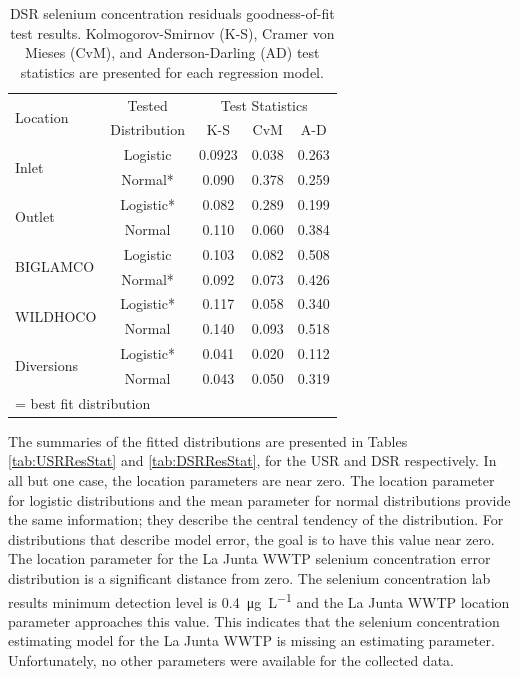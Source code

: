 \begin{linenumbers}
\begin{table}[htbp]
  \centering
  \caption[DSR selenium concentration residuals goodness-of-fit test results.]{DSR selenium concentration residuals goodness-of-fit test results.  Kolmogorov-Smirnov (K-S), Cramer von Mieses (CvM), and Anderson-Darling (AD) test statistics are presented for each regression model.}
    \begin{tabular}{lcccc}
    \toprule
    \multirow{2}{*}{Location}&Tested & \multicolumn{3}{c}{Test Statistics} \\ \cline{3-5}
    &Distribution  & K-S   & CvM   & A-D \\
    \midrule
    \midrule
    \multirow{2}{*}{Inlet}			&Logistic	&0.0923	&0.038	&0.263	\\
    								&Normal*	&0.090	&0.378	&0.259	\\
    \midrule
    \multirow{2}{*}{Outlet}			&Logistic*	&0.082	&0.289	&0.199	\\
    								&Normal		&0.110	&0.060	&0.384	\\
    \midrule
    \multirow{2}{*}{BIGLAMCO}		&Logistic	&0.103	&0.082	&0.508	\\
    								&Normal*	&0.092	&0.073	&0.426	\\
    \midrule
    \multirow{2}{*}{WILDHOCO}		&Logistic*	&0.117	&0.058	&0.340	\\
    								&Normal		&0.140	&0.093	&0.518	\\
	\midrule
    \multirow{2}{*}{Diversions}		&Logistic*	&0.041	&0.020	&0.112	\\
    								&Normal		&0.043	&0.050	&0.319	\\
    \midrule
    \bottomrule
    \multicolumn{5}{l}{\footnotesize * = best fit distribution}\\
    \end{tabular}%
  \label{tab:DSRGof}%
\end{table}%

The summaries of the fitted distributions are presented in Tables \ref{tab:USRResStat} and \ref{tab:DSRResStat}, for the USR and DSR respectively.  In all but one case, the location parameters are near zero.  The location parameter for logistic distributions and the mean parameter for normal distributions provide the same information; they describe the central tendency of the distribution.  For distributions that describe model error, the goal is to have this value near zero.  The location parameter for the La Junta WWTP selenium concentration error distribution is a significant distance from zero.  The selenium concentration lab results minimum detection level is \SI{0.4}{\micro\gram\per\liter} and the La Junta WWTP location parameter approaches this value.  This indicates that the selenium concentration estimating model for the La Junta WWTP is missing an estimating parameter.  Unfortunately, no other parameters were available for the collected data.


\end{linenumbers}
